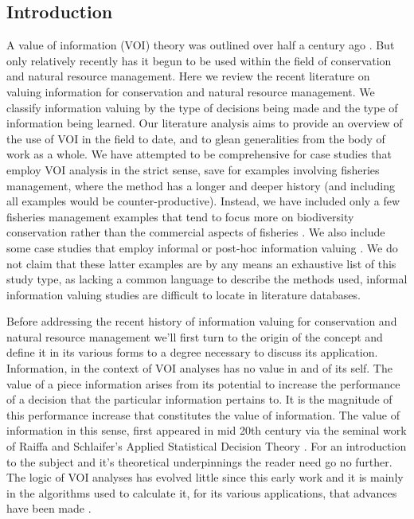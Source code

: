 \documentclass[]{article}
\theoremstyle{definition}
\theoremstyle{definition}
\theoremstyle{definition}
\theoremstyle{remark}
\begin{document}
\subsection*{Introduction}\label{introduction}

A value of information (VOI) theory was outlined over half a century ago
\citep{Raiffa1961}. But only relatively recently has it begun to be used
within the field of conservation and natural resource management. Here
we review the recent literature on valuing information for conservation
and natural resource management. We classify information valuing by the
type of decisions being made and the type of information being learned.
Our literature analysis aims to provide an overview of the use of VOI in
the field to date, and to glean generalities from the body of work as a
whole. We have attempted to be comprehensive for case studies that
employ VOI analysis in the strict sense, save for examples involving
fisheries management, where the method has a longer and deeper history
\citep[see e.g.,][]{Walters1986} (and including all examples would be
counter-productive). Instead, we have included only a few fisheries
management examples that tend to focus more on biodiversity conservation
rather than the commercial aspects of fisheries
\citep[e.g.,][]{Costello2010}. We also include some case studies that
employ informal or post-hoc information valuing
\citep[e.g.,][]{Balmford1999, Hermoso2013}. We do not claim that these
latter examples are by any means an exhaustive list of this study type,
as lacking a common language to describe the methods used, informal
information valuing studies are difficult to locate in literature
databases.

Before addressing the recent history of information valuing for
conservation and natural resource management we'll first turn to the
origin of the concept and define it in its various forms to a degree
necessary to discuss its application. Information, in the context of VOI
analyses has no value in and of its self. The value of a piece
information arises from its potential to increase the performance of a
decision that the particular information pertains to. It is the
magnitude of this performance increase that constitutes the value of
information. The value of information in this sense, first appeared in
mid 20th century via the seminal work of Raiffa and Schlaifer's Applied
Statistical Decision Theory \citep{Raiffa1961}. For an introduction to
the subject and it's theoretical underpinnings the reader need go no
further. The logic of VOI analyses has evolved little since this early
work and it is mainly in the algorithms used to calculate it, for its
various applications, that advances have been made
\citep{Yokota2004a, Yokota2004b}.
\end{document}
